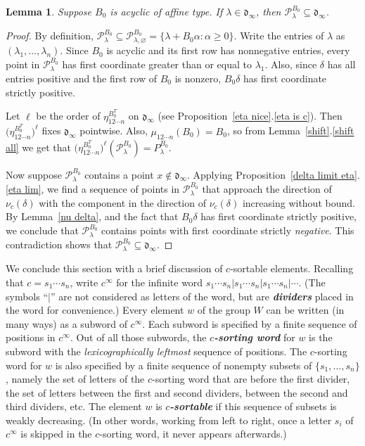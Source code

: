 \documentclass[10pt]{article}
\newtheorem{lemma}[proposition]{Lemma}
\theoremstyle{definition}
\theoremstyle{remark}
\numberwithin{equation}{section}
\newcommand{\newword}[1]{\textbf{\emph{#1}}}
\newcommand{\set}[1]{{\lbrace #1 \rbrace}}
\newcommand{\0}{{\mathbf{0}}}
\renewcommand{\P}{\mathcal{P}}
\renewcommand{\d}{{\mathfrak d}}
\begin{document}
\begin{lemma}\label{P in dinf}
Suppose $B_0$ is acyclic of affine type.
If $\lambda\in\d_\infty$, then $\P^{B_0}_\lambda\subseteq\d_\infty$.
\end{lemma}
\begin{proof}
By definition, $\P^{B_0}_\lambda\subseteq\P^{B_0}_{\lambda,\varnothing}=\set{\lambda+B_0\alpha:\alpha\ge0}$.
Write the entries of $\lambda$ as $(\lambda_1,\ldots,\lambda_n)$.
Since $B_0$ is acyclic and its first row has nonnegative entries, every point in $\P^{B_0}_\lambda$ has first coordinate greater than or equal to $\lambda_1$.
Also, since $\delta$ has all entries positive and the first row of $B_0$ is nonzero, $B_0\delta$ has first coordinate strictly positive.

Let $\ell$ be the order of $\eta^{B_0^T}_{12\cdots n}$ on $\d_\infty$ (see Proposition~\ref{eta nice}.\ref{eta is c}).
Then $\bigl(\eta^{B_0^T}_{12\cdots n}\bigr)^\ell$ fixes $\d_\infty$ pointwise.
Also, $\mu_{12\cdots n}(B_0)=B_0$, so from Lemma~\ref{shift}.\ref{shift all} we get that ${\bigl(\eta^{B_0^T}_{12\cdots n}\bigr)^\ell(\P_\lambda^{B_0})=P_\lambda^{B_0}}$.

Now suppose $\P^{B_0}_\lambda$ contains a point $x\not\in\d_\infty$.
Applying Proposition~\ref{delta limit eta}.\ref{eta lim}, we find a sequence of points in $\P^{B_0}_\lambda$ that approach the direction of $\nu_c(\delta)$ with the component in the direction of $\nu_c(\delta)$ increasing without bound.
By Lemma~\ref{nu delta}, and the fact that $B_0\delta$ has first coordinate strictly positive, we conclude that $\P^{B_0}_\lambda$ contains points with first coordinate strictly \emph{negative}.
This contradiction shows that $\P^{B_0}_\lambda\subseteq\d_\infty$.
\end{proof}

We conclude this section with a brief discussion of $c$-sortable elements.  
Recalling that $c=s_1\cdots s_n$, write $c^\infty$ for the infinite word $s_1\cdots s_n|s_1\cdots s_n|s_1\cdots s_n|\cdots$.
(The symbols ``$|$'' are not considered as letters of the word, but are \newword{dividers} placed in the word for convenience.)
Every element $w$ of the group $W$ can be written (in many ways) as a subword of $c^\infty$.
Each subword is specified by a finite sequence of positions in $c^\infty$.
Out of all those subwords, the \newword{$c$-sorting word} for $w$ is the subword with the \emph{lexicographically leftmost} sequence of positions.
The $c$-sorting word for $w$ is also specified by a finite sequence of nonempty subsets of $\set{s_1,\ldots,s_n}$, namely the set of letters of the $c$-sorting word that are before the first divider, the set of letters between the first and second dividers, between the second and third dividers, etc.
The element $w$ is \newword{$c$-sortable} if this sequence of subsets is weakly decreasing.
(In other words, working from left to right, once a letter $s_i$ of $c^\infty$ is skipped in the $c$-sorting word, it never appears afterwards.)
\end{document}
